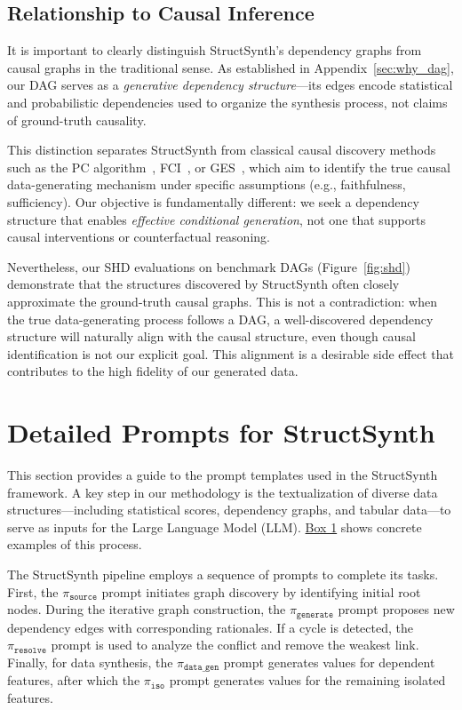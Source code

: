\subsection{Relationship to Causal Inference}
It is important to clearly distinguish StructSynth's dependency graphs from causal graphs in the traditional sense. As established in Appendix~\ref{sec:why_dag}, our DAG serves as a \emph{generative dependency structure}---its edges encode statistical and probabilistic dependencies used to organize the synthesis process, not claims of ground-truth causality.

This distinction separates StructSynth from classical causal discovery methods such as the PC algorithm~\cite{spirtes2000causation}, FCI~\cite{spirtes2000causation}, or GES~\cite{chickering2002optimal}, which aim to identify the true causal data-generating mechanism under specific assumptions (e.g., faithfulness, sufficiency). Our objective is fundamentally different: we seek a dependency structure that enables \emph{effective conditional generation}, not one that supports causal interventions or counterfactual reasoning.

Nevertheless, our SHD evaluations on benchmark DAGs (Figure~\ref{fig:shd}) demonstrate that the structures discovered by StructSynth often closely approximate the ground-truth causal graphs. This is not a contradiction: when the true data-generating process follows a DAG, a well-discovered dependency structure will naturally align with the causal structure, even though causal identification is not our explicit goal. This alignment is a desirable side effect that contributes to the high fidelity of our generated data.

\section{Detailed Prompts for StructSynth}
\label{app:prompts}
This section provides a guide to the prompt templates used in the StructSynth framework. A key step in our methodology is the textualization of diverse data structures---including statistical scores, dependency graphs, and tabular data---to serve as inputs for the Large Language Model (LLM). \hyperref[box:textualization_examples]{Box 1} shows concrete examples of this process. 

The StructSynth pipeline employs a sequence of prompts to complete its tasks. First, the \hyperref[prompt:source]{\texttt{$\pi_\mathtt{source}$}} prompt initiates graph discovery by identifying initial root nodes. During the iterative graph construction, the \hyperref[prompt:generation]{\texttt{$\pi_\mathtt{generate}$}} prompt proposes new dependency edges with corresponding rationales. If a cycle is detected, the \hyperref[prompt:resolve]{\texttt{$\pi_\mathtt{resolve}$}} prompt is used to analyze the conflict and remove the weakest link. Finally, for data synthesis, the \hyperref[prompt:data_gen]{\texttt{$\pi_\mathtt{data\_gen}$}} prompt generates values for dependent features, after which the \hyperref[prompt:data_gen_iso]{\texttt{$\pi_\mathtt{iso}$}} prompt generates values for the remaining isolated features.


